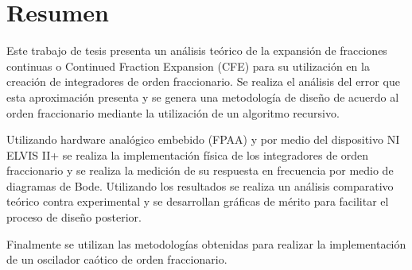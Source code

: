 \chapter{Resumen}


	Este trabajo de tesis presenta un análisis teórico de la expansión de fracciones continuas o Continued Fraction Expansion (CFE) para su utilización en la creación de integradores de orden fraccionario. Se realiza el análisis del error que esta aproximación presenta y se genera una metodología de diseño de acuerdo al orden fraccionario mediante la utilización de un algoritmo recursivo.
	
	Utilizando hardware analógico embebido (FPAA) y por medio del dispositivo NI ELVIS II+ se realiza la implementación física de los integradores de orden fraccionario y se realiza la medición de su respuesta en frecuencia por medio de diagramas de Bode. Utilizando los resultados  se realiza un análisis comparativo teórico contra experimental y se desarrollan gráficas de mérito para facilitar el proceso de diseño posterior.
	
	Finalmente se utilizan las metodologías obtenidas para realizar la implementación de un oscilador caótico de orden fraccionario.
	